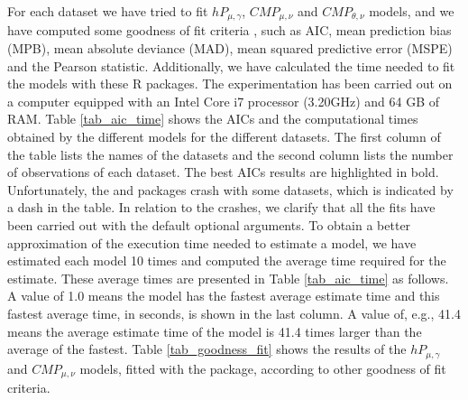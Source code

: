 For each dataset we have tried to fit $hP_{\mu, \gamma}$, $CMP_{\mu, \nu}$ and $CMP_{\theta, \nu}$ models, and we have computed some goodness of fit criteria \citep{Lord10}, such as AIC, mean prediction bias (MPB), mean absolute deviance (MAD), mean squared predictive error (MSPE) and the Pearson statistic. Additionally, we have calculated the time needed to fit the models with these R packages. The experimentation has been carried out on a computer equipped with an Intel Core i7 processor (3.20GHz) and 64 GB of RAM. Table \ref{tab_aic_time} shows the AICs and the computational times obtained by the different models for the different datasets. The first column of the table lists the names of the datasets and the second column lists the number of observations of each dataset. The best AICs results are highlighted in bold. Unfortunately, the  and  packages crash with some datasets, which is indicated by a dash in the table. In relation to the crashes, we clarify that all the fits have been carried out with the default optional arguments. To obtain a better approximation of the execution time needed to estimate a model, we have estimated each model 10 times and computed the  average time required for the estimate. These average times are presented in Table \ref{tab_aic_time} as follows. A value of 1.0 means the model has the fastest average estimate time and this fastest average time, in seconds, is shown in the last column. A value of, e.g.,  41.4 means the average estimate time of the model is 41.4 times larger than the average of the fastest. Table \ref{tab_goodness_fit} shows the results of the $hP_{\mu, \gamma}$ and $CMP_{\mu, \nu}$ models, fitted with the  package, according to other goodness of fit criteria.

